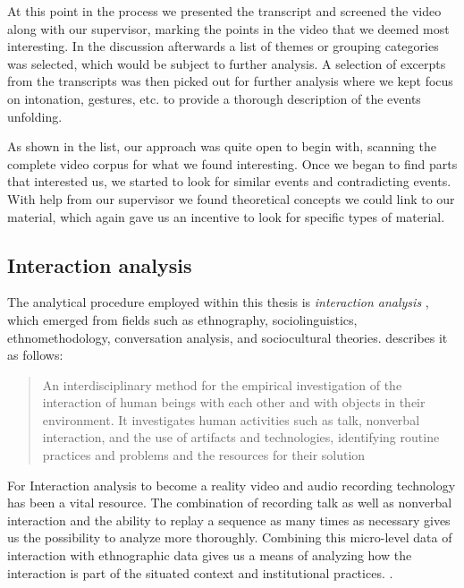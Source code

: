 At this point in the process we presented the transcript and screened the video along with our supervisor, marking the points in the video that we deemed most interesting. In the discussion afterwards a list of themes or grouping categories was selected, which would be subject to further analysis. A selection of excerpts from the transcripts was then picked out for further analysis where we kept focus on intonation, gestures, etc. to provide a thorough description of the events unfolding. 

As shown in the list, our approach was quite open to begin with, scanning the complete video corpus for what we found interesting. Once we began to find parts that interested us, we started to look for similar events and contradicting events. With help from our supervisor we found theoretical concepts we could link to our material, which again gave us an incentive to look for specific types of material.

\subsection{Interaction analysis}
The analytical procedure employed within this thesis is \emph{interaction analysis} \citep{jordan1995interaction}, which emerged from fields such as ethnography, sociolinguistics, ethnomethodology, conversation analysis, and sociocultural theories. \citeauthor{jordan1995interaction} describes it as follows:

\begin{quote}
An interdisciplinary method for the empirical investigation of the interaction of human
beings with each other and with objects in their environment. It investigates human
activities such as talk, nonverbal interaction, and the use of artifacts and technologies,
identifying routine practices and problems and the resources for their solution \citep[p39]{jordan1995interaction}
\end{quote}

For Interaction analysis to become a reality video and audio recording technology has been a vital resource. The combination of recording talk as well as nonverbal interaction and the ability to replay a sequence as many times as necessary gives us the possibility to analyze more thoroughly. Combining this micro-level data of interaction with ethnographic data gives us a means of analyzing how the interaction is part of the situated context and institutional practices. \citep{furberg2009scientific}. 

